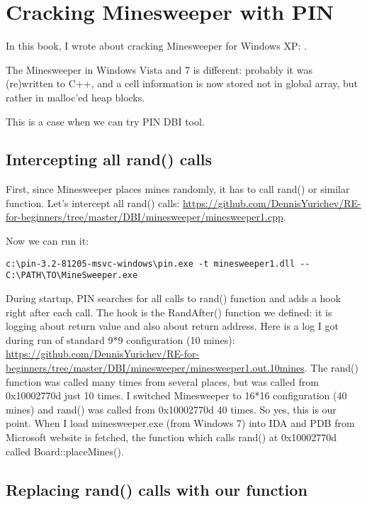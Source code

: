 \section{Cracking Minesweeper with PIN}

\newcommand{\GitHubMinesweeperURL}{https://github.com/DennisYurichev/RE-for-beginners/tree/master/DBI/minesweeper}

In this book, I wrote about cracking Minesweeper for Windows XP: .

The Minesweeper in Windows Vista and 7 is different: probably it was (re)written to C++, and a cell information
is now stored not in global array, but rather in malloc'ed heap blocks.

This is a case when we can try PIN DBI tool.

\subsection{Intercepting all rand() calls}

First, since Minesweeper places mines randomly, it has to call rand() or similar function.
Let's intercept all rand() calls: \url{\GitHubMinesweeperURL/minesweeper1.cpp}.

Now we can run it:

\begin{lstlisting}
c:\pin-3.2-81205-msvc-windows\pin.exe -t minesweeper1.dll -- C:\PATH\TO\MineSweeper.exe
\end{lstlisting}

During startup, PIN searches for all calls to rand() function and adds a hook right after each call.
The hook is the RandAfter() function we defined: it is logging about return value and also about return address.
Here is a log I got during run of standard 9*9 configuration (10 mines): \url{\GitHubMinesweeperURL/minesweeper1.out.10mines}.
The rand() function was called many times from several places, but was called from 0x10002770d just 10 times.
I switched Minesweeper to 16*16 configuration (40 mines) and rand() was called from 0x10002770d 40 times.
So yes, this is our point.
When I load minesweeper.exe (from Windows 7) into IDA and PDB from Microsoft website is fetched,
the function which calls rand() at 0x10002770d called Board::placeMines().

\subsection{Replacing rand() calls with our function}

